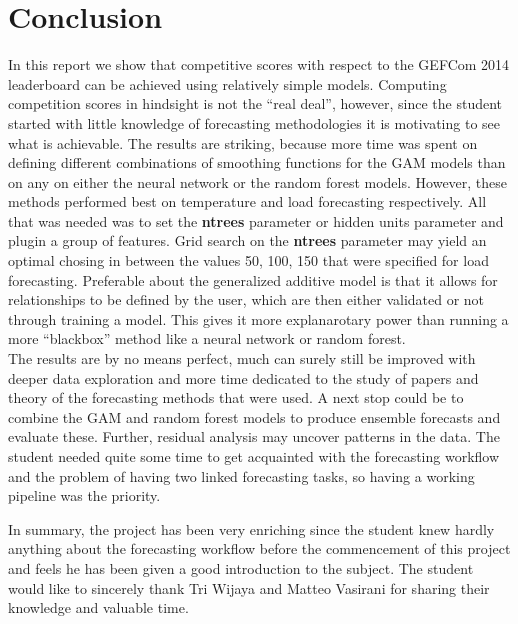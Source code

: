 \documentclass[conference]{IEEEtran}
\begin{document}
\section{Conclusion}
In this report we show that competitive scores with respect to the GEFCom 2014 leaderboard can be achieved using relatively simple models. Computing competition scores in hindsight is not the ``real deal'', however, since the student started with little knowledge of forecasting methodologies it is motivating to see what is achievable. The results are striking, because more time was spent on defining different combinations of smoothing functions for the GAM models than on any on either the neural network or the random forest models. However, these methods performed best on temperature and load forecasting respectively. All that was needed was to set the \textbf{ntrees} parameter or hidden units parameter and plugin a group of features. Grid search on the \textbf{ntrees} parameter may yield an optimal chosing in between the values 50, 100, 150 that were specified for load forecasting. Preferable about the generalized additive model is that it allows for relationships to be defined by the user, which are then either validated or not through training a model. This gives it more explanarotary power than running a more ``blackbox'' method like a neural network or random forest.\\
The results are by no means perfect, much can surely still be improved with deeper data exploration and more time dedicated to the study of papers and theory of the forecasting methods that were used. A next stop could be to combine the GAM and random forest models to produce ensemble forecasts and evaluate these. Further, residual analysis may uncover patterns in the data. The student needed quite some time to get acquainted with the forecasting workflow and the problem of having two linked forecasting tasks, so having a working pipeline was the priority.\par
In summary, the project has been very enriching since the student knew hardly anything about the forecasting workflow before the commencement of this project and feels he has been given a good introduction to the subject. The student would like to sincerely thank Tri Wijaya and Matteo Vasirani for sharing their knowledge and valuable time.


{}
\end{document}
